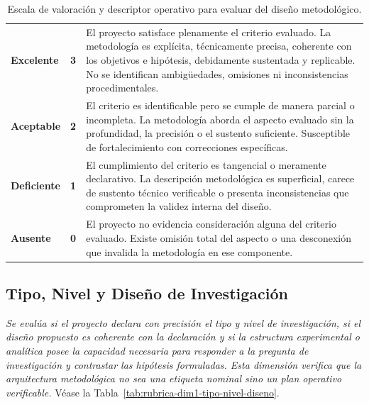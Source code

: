 \begin{table}[htbp]
\centering
\scriptsize
\caption{Escala de valoración y descriptor operativo para evaluar del diseño metodológico.}
\label{tab:escala-metodologia}
\begin{tabularx}{\textwidth}{|C{2.8cm}|C{1cm}|X|}
\hline
{}
 &  &  \\ \hline
\textcolor{csuf}{\textbf{Excelente}} & \textbf{3} & El proyecto satisface plenamente el criterio evaluado. La metodología es explícita, técnicamente precisa, coherente con los objetivos e hipótesis, debidamente sustentada y replicable. No se identifican ambigüedades, omisiones ni inconsistencias procedimentales. \\ \hline
{}
\textcolor{cace}{\textbf{Aceptable}} & \textbf{2} & El criterio es identificable pero se cumple de manera parcial o incompleta. La metodología aborda el aspecto evaluado sin la profundidad, la precisión o el sustento suficiente. Susceptible de fortalecimiento con correcciones específicas. \\ \hline
\textcolor{cdef}{\textbf{Deficiente}} & \textbf{1} & El cumplimiento del criterio es tangencial o meramente declarativo. La descripción metodológica es superficial, carece de sustento técnico verificable o presenta inconsistencias que comprometen la validez interna del diseño. \\ \hline
{}
\textcolor{cins}{\textbf{Ausente}} & \textbf{0} & El proyecto no evidencia consideración alguna del criterio evaluado. Existe omisión total del aspecto o una desconexión que invalida la metodología en ese componente. \\ \hline
\end{tabularx}
\end{table}

\clearpage
\subsection{Tipo, Nivel y Diseño de Investigación}

\textit{Se evalúa si el proyecto declara con precisión el tipo y nivel de investigación, si el diseño propuesto es coherente con la declaración y si la estructura experimental o analítica posee la capacidad necesaria para responder a la pregunta de investigación y contrastar las hipótesis formuladas. Esta dimensión verifica que la arquitectura metodológica no sea una etiqueta nominal sino un plan operativo verificable.} Véase la Tabla~\ref{tab:rubrica-dim1-tipo-nivel-diseno}.

